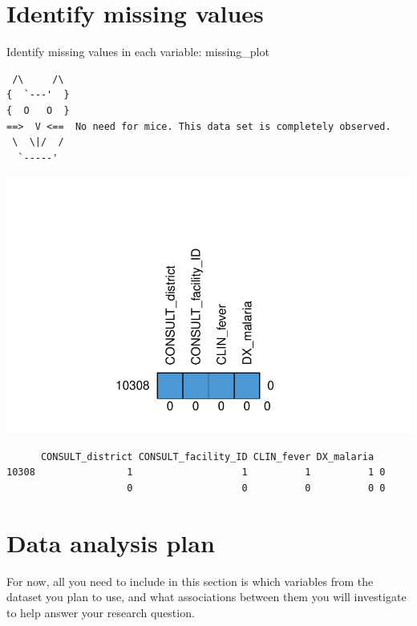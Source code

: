 \documentclass[
  letterpaper,
  DIV=11,
  numbers=noendperiod]{scrreprt}
\begin{document}

\hypertarget{identify-missing-values}{%
\chapter{Identify missing values}\label{identify-missing-values}}

Identify missing values in each variable: missing\_plot

\begin{verbatim}
 /\     /\
{  `---'  }
{  O   O  }
==>  V <==  No need for mice. This data set is completely observed.
 \  \|/  /
  `-----'
\end{verbatim}

\includegraphics{./ds4ph_day2_session01_practical_session_files/figure-pdf/unnamed-chunk-8-1.pdf}

\begin{verbatim}
      CONSULT_district CONSULT_facility_ID CLIN_fever DX_malaria  
10308                1                   1          1          1 0
                     0                   0          0          0 0
\end{verbatim}


\hypertarget{data-analysis-plan}{%
\chapter{Data analysis plan}\label{data-analysis-plan}}

For now, all you need to include in this section is which variables from
the dataset you plan to use, and what associations between them you will
investigate to help answer your research question.
\end{document}
